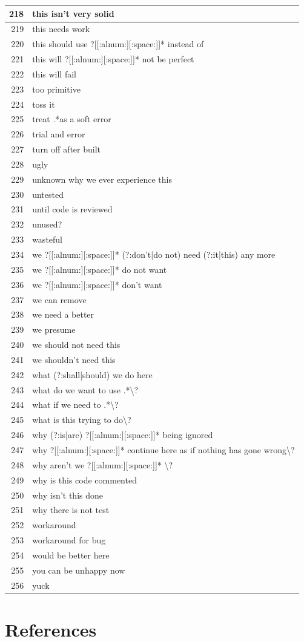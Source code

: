 \documentclass[
]{article}
\begin{document}
\begin{longtable}{r|l}
\hline
218 & this isn't very solid\\
\hline
219 & this needs work\\
\hline
220 & this should use ?[[:alnum:][:space:]]* instead of\\
\hline
221 & this will ?[[:alnum:][:space:]]* not be perfect\\
\hline
222 & this will fail\\
\hline
223 & too primitive\\
\hline
224 & toss it\\
\hline
225 & treat .*as a soft error\\
\hline
226 & trial and error\\
\hline
227 & turn off after built\\
\hline
228 & ugly\\
\hline
229 & unknown why we ever experience this\\
\hline
230 & untested\\
\hline
231 & until code is reviewed\\
\hline
232 & unused?\\
\hline
233 & wasteful\\
\hline
234 & we ?[[:alnum:][:space:]]* (?:don't|do not) need (?:it|this) any more\\
\hline
235 & we ?[[:alnum:][:space:]]* do not want\\
\hline
236 & we ?[[:alnum:][:space:]]* don't want\\
\hline
237 & we can remove\\
\hline
238 & we need a better\\
\hline
239 & we presume\\
\hline
240 & we should not need this\\
\hline
241 & we shouldn't need this\\
\hline
242 & what (?:shall|should) we do here\\
\hline
243 & what do we want to use .*\textbackslash{}?\\
\hline
244 & what if we need to .*\textbackslash{}?\\
\hline
245 & what is this trying to do\textbackslash{}?\\
\hline
246 & why (?:is|are) ?[[:alnum:][:space:]]* being ignored\\
\hline
247 & why ?[[:alnum:][:space:]]* continue here as if nothing has gone wrong\textbackslash{}?\\
\hline
248 & why aren't we ?[[:alnum:][:space:]]* \textbackslash{}?\\
\hline
249 & why is this code commented\\
\hline
250 & why isn't this done\\
\hline
251 & why there is not test\\
\hline
252 & workaround\\
\hline
253 & workaround for bug\\
\hline
254 & would be better here\\
\hline
255 & you can be unhappy now\\
\hline
256 & yuck\\
\hline
\end{longtable}

\normalsize

\section{References}

\printbibliography
\end{document}
